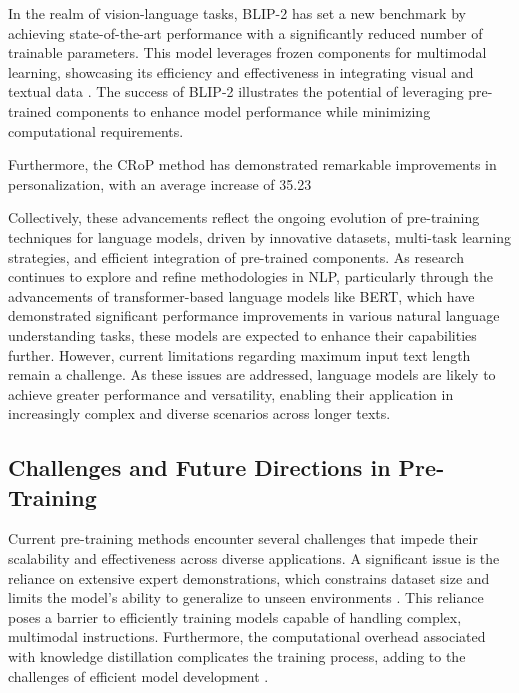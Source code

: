 In the realm of vision-language tasks, BLIP-2 has set a new benchmark by achieving state-of-the-art performance with a significantly reduced number of trainable parameters. This model leverages frozen components for multimodal learning, showcasing its efficiency and effectiveness in integrating visual and textual data \cite{li2023blip}. The success of BLIP-2 illustrates the potential of leveraging pre-trained components to enhance model performance while minimizing computational requirements.



Furthermore, the CRoP method has demonstrated remarkable improvements in personalization, with an average increase of 35.23%



Collectively, these advancements reflect the ongoing evolution of pre-training techniques for language models, driven by innovative datasets, multi-task learning strategies, and efficient integration of pre-trained components. As research continues to explore and refine methodologies in NLP, particularly through the advancements of transformer-based language models like BERT, which have demonstrated significant performance improvements in various natural language understanding tasks, these models are expected to enhance their capabilities further. However, current limitations regarding maximum input text length remain a challenge. As these issues are addressed, language models are likely to achieve greater performance and versatility, enabling their application in increasingly complex and diverse scenarios across longer texts. \cite{wei2022chain,ginzburg2021selfsuperviseddocumentsimilarityranking}




\subsection{Challenges and Future Directions in Pre-Training} \label{subsec:Challenges and Future Directions in Pre-Training}



Current pre-training methods encounter several challenges that impede their scalability and effectiveness across diverse applications. A significant issue is the reliance on extensive expert demonstrations, which constrains dataset size and limits the model's ability to generalize to unseen environments \cite{zhou2024languageconditionedimitationlearningbase}. This reliance poses a barrier to efficiently training models capable of handling complex, multimodal instructions. Furthermore, the computational overhead associated with knowledge distillation complicates the training process, adding to the challenges of efficient model development \cite{zhao2022lifelonglearningmultilingualneural}.

